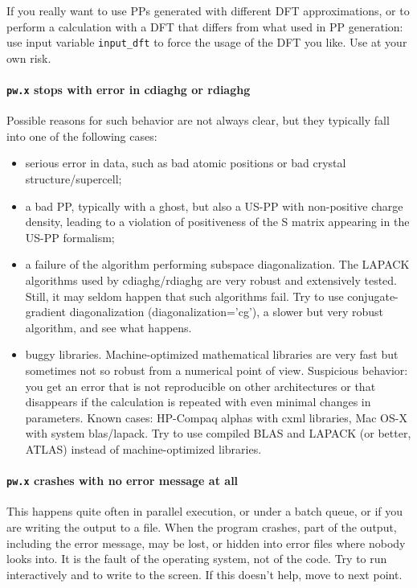 \documentclass[12pt,a4paper]{article}
\def\pw.x{\texttt{pw.x}}
\begin{document}
If you really want to use PPs generated with different DFT approximations, 
or to perform a calculation with a DFT that differs from what used in PP 
generation: use input variable \texttt{input\_dft} to force the usage of 
the DFT you like. Use at your own risk.

\paragraph{\pw.x stops with error in cdiaghg or rdiaghg}
Possible reasons for such behavior are not always clear, but they
typically fall into one of the following cases:
\begin{itemize}
\item serious error in data, such as bad atomic positions or bad
  crystal structure/supercell; 
\item a bad PP, typically with a ghost, but also a US-PP with
  non-positive charge density, leading to a violation of positiveness
  of the S matrix appearing in the US-PP formalism;  
\item a failure of the algorithm performing subspace
  diagonalization. The LAPACK algorithms used by cdiaghg/rdiaghg are
  very robust and extensively tested. Still, it may seldom happen that
  such algorithms fail. Try to use conjugate-gradient diagonalization
  (diagonalization='cg'), a slower but very robust algorithm, and see
  what happens. 
\item buggy libraries. Machine-optimized mathematical libraries are
  very fast but sometimes not so robust from a numerical point of
  view.  Suspicious behavior: you get an error that is not
  reproducible on other architectures or that disappears if the
  calculation is repeated with even minimal changes in
  parameters. Known cases: HP-Compaq alphas with cxml libraries, Mac
  OS-X with system blas/lapack. Try to use compiled BLAS and LAPACK
  (or better, ATLAS) instead of machine-optimized libraries. 
\end{itemize}

\paragraph{\pw.x crashes with no error message at all}
This happens quite often in parallel execution, or under a batch
queue, or if you are writing the output to a file. When the program
crashes, part of the output, including the error message, may be lost,
or hidden into error files where nobody looks into. It is the fault of
the operating system, not of the code. Try to run interactively 
and to write to the screen. If this doesn't help, move to next point.
\end{document}
